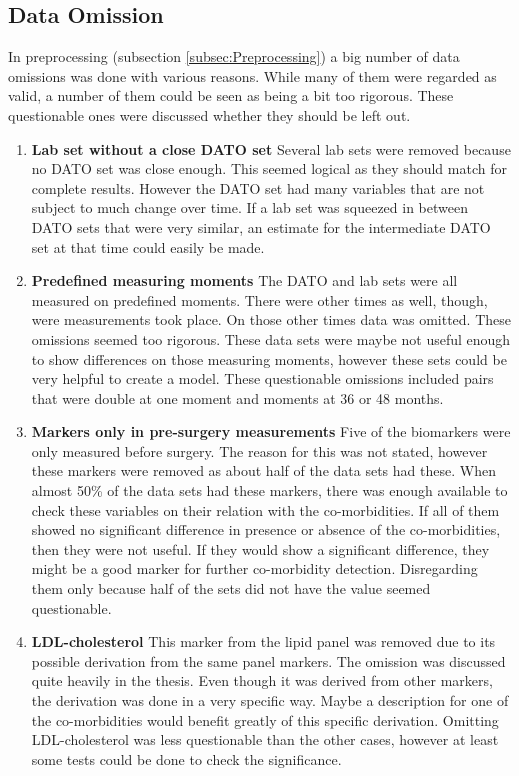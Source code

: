 \documentclass[10pt,a4paper]{report}
\begin{document}
	\subsection{Data Omission}
	
	In preprocessing (subsection \ref{subsec:Preprocessing}) a big number of data omissions was done with various reasons. While many of them were regarded as valid, a number of them could be seen as being a bit too rigorous. These questionable ones were discussed whether they should be left out.
	
	\begin{enumerate}
		\item \textbf{Lab set without a close DATO set} Several lab sets were removed because no DATO set was close enough. This seemed logical as they should match for complete results. However the DATO set had many variables that are not subject to much change over time. If a lab set was squeezed in between DATO sets that were very similar, an estimate for the intermediate DATO set at that time could easily be made.
		
		\item \textbf{Predefined measuring moments} The DATO and lab sets were all measured on predefined moments. There were other times as well, though, were measurements took place. On those other times data was omitted. These omissions seemed too rigorous. These data sets were maybe not useful enough to show differences on those measuring moments, however these sets could be very helpful to create a model. These questionable omissions included pairs that were double at one moment and moments at 36 or 48 months. 
		
		\item \textbf{Markers only in pre-surgery measurements} Five of the biomarkers were only measured before surgery. The reason for this was not stated, however these markers were removed as about half of the data sets had these. When almost 50\% of the data sets had these markers, there was enough available to check these variables on their relation with the co-morbidities. If all of them showed no significant difference in presence or absence of the co-morbidities, then they were not useful. If they would show a significant difference, they might be a good marker for further co-morbidity detection. Disregarding them only because half of the sets did not have the value seemed questionable.
		
		\item \textbf{LDL-cholesterol} This marker from the lipid panel was removed due to its possible derivation from the same panel markers. The omission was discussed quite heavily in the thesis. Even though it was derived from other markers, the derivation was done in a very specific way. Maybe a description for one of the co-morbidities would benefit greatly of this specific derivation. Omitting LDL-cholesterol was less questionable than the other cases, however at least some tests could be done to check the significance.
		
	\end{enumerate}
	
\end{document}
